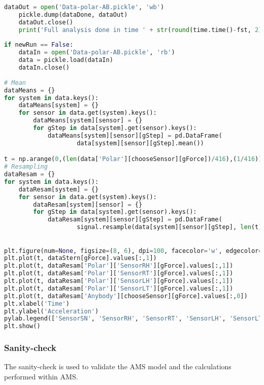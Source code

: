 \begin{lstlisting}[language=Python]
    dataOut = open('Data-polar-AB.pickle', 'wb')
    pickle.dump(dataDone, dataOut) 
    dataOut.close()
    print('Full analysis done in time ' + str(round(time.time()-fst, 2)) + ' seconds.')
    
if newRun == False:
    dataIn = open('Data-polar-AB.pickle', 'rb') 
    data = pickle.load(dataIn)
    dataIn.close()    
    
# Mean
dataMeans = {}
for system in data.keys():
    dataMeans[system] = {}
    for sensor in data.get(system).keys():
        dataMeans[system][sensor] = {}
        for gStep in data[system].get(sensor).keys():
            dataMeans[system][sensor][gStep] = pd.DataFrame(
                    data[system][sensor][gStep].mean())

t = np.arange(0,(len(data['Polar'][chooseSensor][gForce])/416),(1/416))
# Resampling
dataResam = {}
for system in data.keys():
    dataResam[system] = {}
    for sensor in data.get(system).keys():
        dataResam[system][sensor] = {}
        for gStep in data[system].get(sensor).keys():
            dataResam[system][sensor][gStep] = pd.DataFrame(
                    signal.resample(data[system][sensor][gStep], len(t)))
        

plt.figure(num=None, figsize=(8, 6), dpi=100, facecolor='w', edgecolor='k' )
plt.plot(t, dataStern[gForce].values[:,1])
plt.plot(t, dataResam['Polar']['SensorRH'][gForce].values[:,1])
plt.plot(t, dataResam['Polar']['SensorRT'][gForce].values[:,1])
plt.plot(t, dataResam['Polar']['SensorLH'][gForce].values[:,1])
plt.plot(t, dataResam['Polar']['SensorLT'][gForce].values[:,1])
plt.plot(t, dataResam['Anybody'][chooseSensor][gForce].values[:,0])
plt.xlabel('Time')
plt.ylabel('Acceleration')
pylab.legend(['SensorSN', 'SensorRH', 'SensorRT', 'SensorLH', 'SensorLT', 'AMS'], loc='center left')
plt.show()
\end{lstlisting}
\clearpage

\subsubsection{Sanity-check}
The sanity-check is used to validate the AMS model and the calculations performed within AMS.

